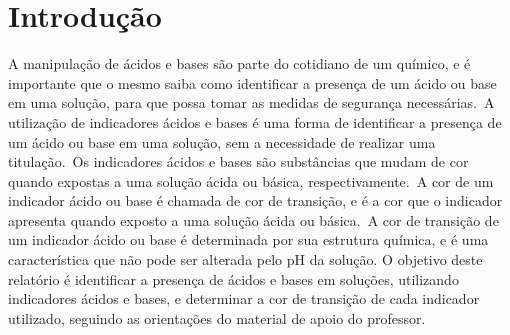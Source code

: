     \section{Introdução}\label{sec:intro}
    
    \indent A manipulação de ácidos e bases são parte do cotidiano de um químico, e é importante que o mesmo saiba como identificar a presença de um ácido ou base em uma solução, para que possa tomar as medidas de segurança necessárias.\  A utilização de indicadores ácidos e bases é uma forma de identificar a presença de um ácido ou base em uma solução, sem a necessidade de realizar uma titulação.\  Os indicadores ácidos e bases são substâncias que mudam de cor quando expostas a uma solução ácida ou básica, respectivamente.\  A cor de um indicador ácido ou base é chamada de cor de transição, e é a cor que o indicador apresenta quando exposto a uma solução ácida ou básica.\  A cor de transição de um indicador ácido ou base é determinada por sua estrutura química, e é uma característica que não pode ser alterada pelo pH da solução.
    \indent O objetivo deste relatório é identificar a presença de ácidos e bases em soluções, utilizando indicadores ácidos e bases, e determinar a cor de transição de cada indicador utilizado, seguindo as orientações do material de apoio do professor.




